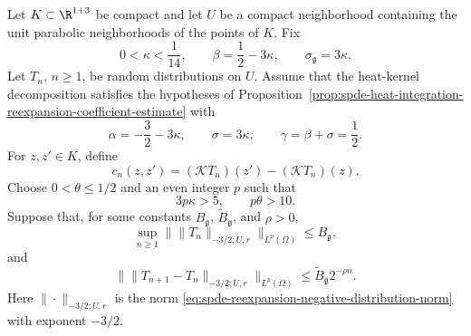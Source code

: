 \begin{proposition}
\label{prop:spde-gamma-coordinate-input-from-x3-heat-integration}
Let \(K\subset\R^{1+3}\) be compact and let \(U\) be a compact neighborhood
containing the unit parabolic neighborhoods of the points of \(K\).  Fix
\[
  0<\kappa<\frac1{14},
  \qquad
  \beta=\frac12-3\kappa,
  \qquad
  \sigma_{\mathfrak g}=3\kappa .
\]
Let \(T_n\), \(n\geq1\), be random distributions on \(U\).  Assume that the
heat-kernel decomposition satisfies the hypotheses of
Proposition~\ref{prop:spde-heat-integration-reexpansion-coefficient-estimate}
with
\[
  \alpha=-\frac32-3\kappa,
  \qquad
  \sigma=3\kappa,
  \qquad
  \gamma=\beta+\sigma=\frac12 .
\]
For \(z,z'\in K\), define
\[
  c_n(z,z')=(\mathcal KT_n)(z')-(\mathcal KT_n)(z).
\]
Choose \(0<\theta\leq1/2\) and an even integer \(p\) such that
\begin{equation}
  3p\kappa>5,
  \qquad
  p\theta>10 .
  \label{eq:spde-gamma-coordinate-input-moment-condition}
\end{equation}
Suppose that, for some constants \(B_{\mathfrak g}\),
\(\widetilde B_{\mathfrak g}\), and \(\rho>0\),
\begin{equation}
  \sup_{n\geq1}
  \bigl\|\|T_n\|_{-3/2;U,r}\bigr\|_{L^p(\Omega)}
  \leq
  B_{\mathfrak g},
  \label{eq:spde-gamma-coordinate-input-x3-uniform}
\end{equation}
and
\begin{equation}
  \bigl\|\|T_{n+1}-T_n\|_{-3/2;U,r}\bigr\|_{L^p(\Omega)}
  \leq
  \widetilde B_{\mathfrak g}2^{-\rho n}.
  \label{eq:spde-gamma-coordinate-input-x3-cauchy}
\end{equation}
Here \(\|\cdot\|_{-3/2;U,r}\) is the norm
\eqref{eq:spde-reexpansion-negative-distribution-norm} with exponent
\(-3/2\).


\end{proposition}
